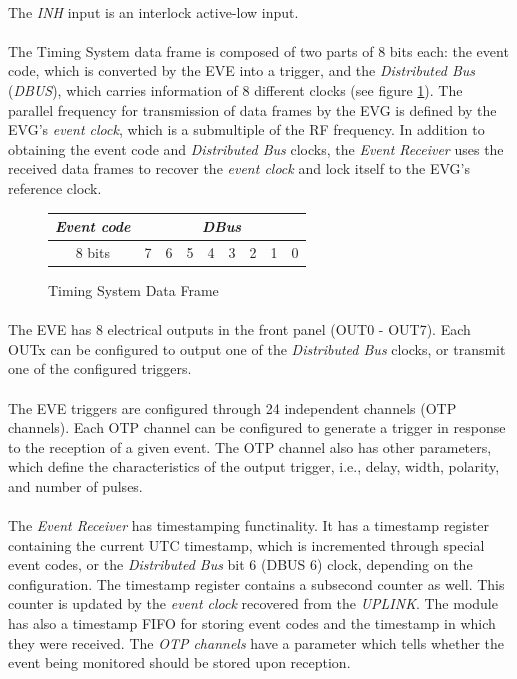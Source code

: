 \documentclass[openany]{article}
\begin{document}
		\paragraph{} The \emph{INH} input is an interlock active-low input.
		\paragraph{} The Timing System data frame is composed of two parts of 8 bits each: the event code, which is converted by the EVE into a trigger, and the \emph{Distributed Bus} (\emph{DBUS}), which carries information of 8 different clocks (see figure \ref{fig:data-frame-eve}). The parallel frequency for transmission of data frames by the EVG is defined by the EVG's \emph{event clock}, which is a submultiple of the RF frequency. In addition to obtaining the event code and \emph{Distributed Bus} clocks, the \emph{Event Receiver} uses the received data frames to recover the \emph{event clock} and lock itself to the EVG's reference clock.

		\begin{figure}[!h]
		\begin{tabular}{|cccccccc|c|c|c|c|c|c|c|c|}
		\hline
		\multicolumn{8}{|c|}{\emph{Event code}} & \multicolumn{8}{c|}{\emph{DBus}} \\ \hline
		\multicolumn{8}{|c|}{8 bits} & 7 & 6 & 5 & 4 & 3 & 2 & 1 & 0 \\ \hline
		\end{tabular}
		\centering
		\caption{Timing System Data Frame}
		\label{fig:data-frame-eve}
		\end{figure}
\FloatBarrier


		\paragraph{} The EVE has 8 electrical outputs in the front panel (OUT0 - OUT7). Each OUTx can be configured to output one of the \emph{Distributed Bus} clocks, or transmit one of the configured triggers.
		\paragraph{} The EVE triggers are configured through 24 independent channels (OTP channels). Each OTP channel can be configured to generate a trigger in response to the reception of a given event. The OTP channel also has other parameters, which define the characteristics of the output trigger, i.e., delay, width, polarity, and number of pulses.
		\paragraph{} The \emph{Event Receiver} has timestamping functinality. It has a timestamp register containing the current UTC timestamp, which is incremented through special event codes, or the \emph{Distributed Bus} bit 6 (DBUS 6) clock, depending on the configuration. The timestamp register contains a subsecond counter as well. This counter is updated by the \emph{event clock} recovered from the \emph{UPLINK}. The module has also a timestamp FIFO for storing event codes and the timestamp in which they were received. The \emph{OTP channels} have a parameter which tells whether the event being monitored should be stored upon reception.
\end{document}
